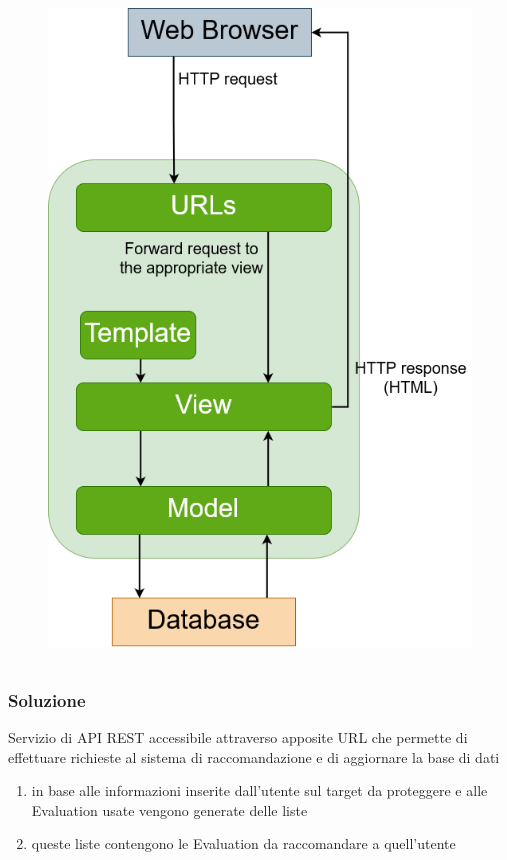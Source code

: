 \begin{frame}
\begin{columns}
\begin{column}{0.5\textwidth}
\begin{figure}
                \includegraphics[scale=0.5]{images/IB_CF_ex}
            \end{figure}
        \end{column}
    \end{columns}
\end{frame}

\begin{frame}
    \frametitle{Soluzione}
    Servizio di \alert{API REST} accessibile attraverso apposite URL che permette di effettuare richieste al sistema di 
    raccomandazione e di aggiornare la base di dati
    \begin{enumerate}
        \item in base alle informazioni inserite dall'utente sul \alert{target} da proteggere e alle Evaluation usate vengono generate delle 
        liste 
        \item queste liste contengono le Evaluation da raccomandare a quell'utente
    \end{enumerate}
\end{frame}

